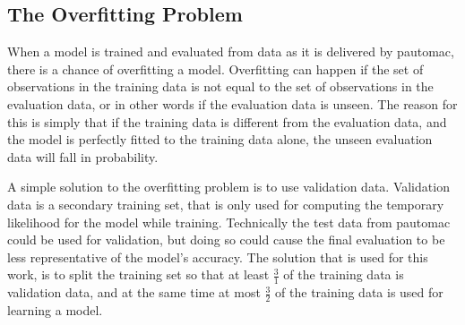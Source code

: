 \subsection{The Overfitting Problem}
When a model is trained and evaluated from data as it is delivered by pautomac, there is a chance of overfitting a model. Overfitting can happen if the set of observations in the training data is not equal to the set of observations in the evaluation data, or in other words if the evaluation data is unseen. The reason for this is simply that if the training data is different from the evaluation data, and the model is perfectly fitted to the training data alone, the unseen evaluation data will fall in probability.

A simple solution to the overfitting problem is to use validation data. Validation data is a secondary training set, that is only used for computing the temporary likelihood for the model while training. Technically the test data from pautomac could be used for validation, but doing so could cause the final evaluation to be less representative of the model's accuracy. The solution that is used for this work, is to split the training set so that at least $\frac{3}{1}$ of the training data is validation data, and at the same time at most $\frac{3}{2}$ of the training data is used for learning a model.